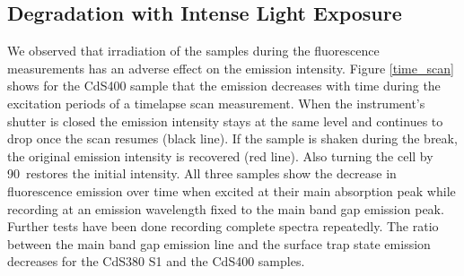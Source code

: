 \documentclass[cits]{JINST}
\begin{document}


\subsection{Degradation with Intense Light Exposure}
We observed that irradiation of the samples during the fluorescence measurements has an adverse effect on the emission intensity. Figure \ref{time_scan} shows for the CdS400 sample that the emission decreases with time during the excitation periods of a timelapse scan measurement. When the instrument's shutter is closed the emission intensity stays at the same level and continues to drop once the scan resumes (black line). If the sample is shaken during the break, the original emission intensity is recovered (red line). Also turning the cell by 90\textdegree ~restores the initial intensity. All three samples show the decrease in fluorescence emission over time when excited at their main absorption peak while recording at an emission wavelength fixed to the main band gap emission peak. Further tests have been done recording complete spectra repeatedly. The ratio between the main band gap emission line and the surface trap state emission decreases for the CdS380 S1 and the CdS400 samples. 
\end{document}

